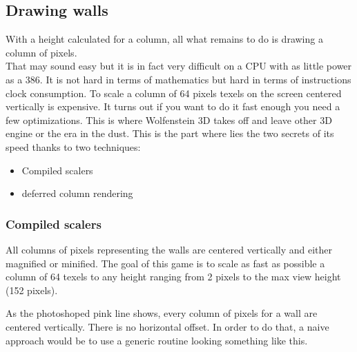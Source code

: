  \begin{minipage}{\textwidth}
 
\centering
\vspace*{0.5cm}
\centering


 \end{minipage}


 \par
 
 \begin{minipage}{\textwidth}
\centering
\vspace*{0.5cm}
\centering
\end{minipage}











\subsection{Drawing walls}
With a height calculated for a column, all what remains to do is drawing a column of pixels.\\
That may sound easy but it is in fact very difficult on a CPU with as little power as a 386. It is not hard in terms of mathematics but hard in terms of instructions clock consumption. To scale a column of 64 pixels texels on the screen centered vertically is expensive. It turns out if you want to do it fast enough you need a few optimizations. This is where Wolfenstein 3D takes off and leave other 3D engine or the era in the dust. This is the part where lies the two secrets of its  speed thanks to two techniques:
\begin{itemize}
\item Compiled scalers
\item deferred column rendering
\end{itemize}
\par

\subsubsection{Compiled scalers}
All columns of pixels representing the walls are centered vertically and either magnified or minified. The goal of this game is to scale as fast as possible a column of 64 texels to any height ranging from 2 pixels to the max view height (152 pixels).\\
\par
 \begin{figure}[H]
\centering
 \end{figure}
\par
As the photoshoped pink line shows, every column of pixels for a wall are centered vertically. There is no horizontal offset. In order to do that, a naive approach would be to use a generic routine looking something like this.\\


